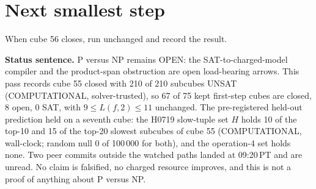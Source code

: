 \documentclass[11pt]{article}
\begin{document}
\section*{Next smallest step}
When cube 56 closes, run  unchanged and record the result.

\bigskip
\noindent\textbf{Status sentence.} P versus NP remains OPEN: the SAT-to-charged-model compiler and the product-span obstruction are open load-bearing arrows. This pass records cube 55 closed with 210 of 210 subcubes UNSAT (COMPUTATIONAL, solver-trusted), so 67 of 75 kept first-step cubes are closed, 8 open, 0 SAT, with $9\le L(f,2)\le 11$ unchanged. The pre-registered held-out prediction held on a seventh cube: the H0719 slow-tuple set $H$ holds 10 of the top-10 and 15 of the top-20 slowest subcubes of cube 55 (COMPUTATIONAL, wall-clock; random null 0 of 100\,000 for both), and the operation-4 set holds none. Two peer commits outside the watched paths landed at 09:20\,PT and are unread. No claim is falsified, no charged resource improves, and this is not a proof of anything about P versus NP.
\end{document}
